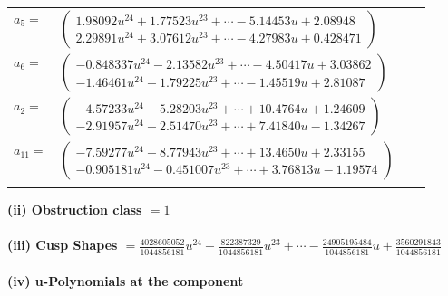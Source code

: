 \documentclass[1p]{elsarticle_modified}
\theoremstyle{definition}
\begin{document}
\begin{tabular}{m{7pt} m{180pt} m{7pt} m{180pt} }
\flushright $a_{5}=$&$\begin{pmatrix}1.98092 u^{24}+1.77523 u^{23}+\cdots-5.14453 u+2.08948\\2.29891 u^{24}+3.07612 u^{23}+\cdots-4.27983 u+0.428471\end{pmatrix}$ \\
\flushright $a_{6}=$&$\begin{pmatrix}-0.848337 u^{24}-2.13582 u^{23}+\cdots-4.50417 u+3.03862\\-1.46461 u^{24}-1.79225 u^{23}+\cdots-1.45519 u+2.81087\end{pmatrix}$ \\
\flushright $a_{2}=$&$\begin{pmatrix}-4.57233 u^{24}-5.28203 u^{23}+\cdots+10.4764 u+1.24609\\-2.91957 u^{24}-2.51470 u^{23}+\cdots+7.41840 u-1.34267\end{pmatrix}$ \\
\flushright $a_{11}=$&$\begin{pmatrix}-7.59277 u^{24}-8.77943 u^{23}+\cdots+13.4650 u+2.33155\\-0.905181 u^{24}-0.451007 u^{23}+\cdots+3.76813 u-1.19574\end{pmatrix}$\\&\end{tabular}
\flushleft \textbf{(ii) Obstruction class $= 1$}\\~\\
\flushleft \textbf{(iii) Cusp Shapes $= \frac{4028605052}{1044856181} u^{24}-\frac{822387329}{1044856181} u^{23}+\cdots-\frac{24905195484}{1044856181} u+\frac{3560291843}{1044856181}$}\\~\\
\newpage\renewcommand{\arraystretch}{1}
\flushleft \textbf{(iv) u-Polynomials at the component}\newline \\
\end{document}
